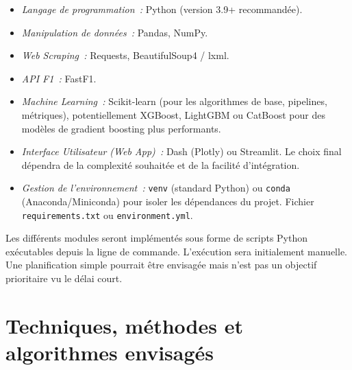 \documentclass[11pt, a4paper]{article}
\begin{document}
\begin{description}[style=standard, itemsep=0.5em, labelwidth=!, leftmargin=1.5em, font=\normalfont]
    \item[Technologies Principales~:]
        \begin{itemize}[label=\textbullet, itemsep=0.2em, leftmargin=*]
            \item \textit{Langage de programmation~:} Python (version 3.9+ recommandée).
            \item \textit{Manipulation de données~:} Pandas, NumPy.
            \item \textit{Web Scraping~:} Requests, BeautifulSoup4 / lxml.
            \item \textit{API F1~:} FastF1.
            \item \textit{Machine Learning~:} Scikit-learn (pour les algorithmes de base, pipelines, métriques), potentiellement XGBoost, LightGBM ou CatBoost pour des modèles de gradient boosting plus performants.
            \item \textit{Interface Utilisateur (Web App)~:} Dash (Plotly) ou Streamlit. Le choix final dépendra de la complexité souhaitée et de la facilité d'intégration.
            \item \textit{Gestion de l'environnement~:} \texttt{venv} (standard Python) ou \texttt{conda} (Anaconda/Miniconda) pour isoler les dépendances du projet. Fichier \texttt{requirements.txt} ou \texttt{environment.yml}.
        \end{itemize}
    \item[Exécution~:] Les différents modules seront implémentés sous forme de scripts Python exécutables depuis la ligne de commande. L'exécution sera initialement manuelle. Une planification simple pourrait être envisagée mais n'est pas un objectif prioritaire vu le délai court.
\end{description}

\section{Techniques, méthodes et algorithmes envisagés}
\end{document}
